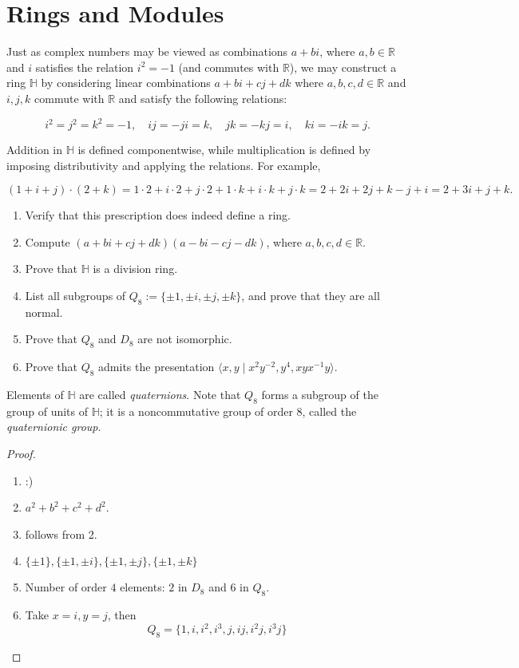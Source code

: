 \documentclass[openany]{book}
\begin{document}
\chapter{Rings and Modules}

\begin{prob}[1.12]
    
Just as complex numbers may be viewed as combinations \( a + bi \), where \( a, b \in \mathbb{R} \) and \( i \) satisfies the relation \( i^2 = -1 \) (and commutes with \(\mathbb{R}\)), we may construct a ring \(\mathbb{H}\) by considering linear combinations \( a + bi + cj + dk \) where \( a, b, c, d \in \mathbb{R} \) and \( i, j, k \) commute with \(\mathbb{R}\) and satisfy the following relations:

\[
i^2 = j^2 = k^2 = -1, \quad ij = -ji = k, \quad jk = -kj = i, \quad ki = -ik = j.
\]

Addition in \(\mathbb{H}\) is defined componentwise, while multiplication is defined by imposing distributivity and applying the relations. For example,

\[
(1+i+j) \cdot (2+k) = 1 \cdot 2 + i \cdot 2 + j \cdot 2 + 1 \cdot k + i \cdot k + j \cdot k = 2 + 2i + 2j + k - j + i = 2 + 3i + j + k.
\]
\begin{enumerate}
    \item Verify that this prescription does indeed define a ring.
    \item Compute \((a + bi + cj + dk)(a - bi - cj - dk)\), where \( a, b, c, d \in \mathbb{R}\).
    \item Prove that \(\mathbb{H}\) is a division ring.
    \item List all subgroups of \( Q_8 := \{\pm 1, \pm i, \pm j, \pm k\} \), and prove that they are all normal.
    \item Prove that \( Q_8 \) and \( D_8 \) are not isomorphic.
    \item Prove that \( Q_8 \) admits the presentation \(\langle x, y \mid x^2 y^{-2}, y^4, xy x^{-1} y \rangle\).
\end{enumerate}

Elements of \(\mathbb{H}\) are called \textit{quaternions}. Note that \( Q_8 \) forms a subgroup of the group of units of \(\mathbb{H}\); it is a noncommutative group of order 8, called the \textit{quaternionic group}.
\end{prob}
\begin{proof}
    \begin{enumerate}
        \item :)
        \item $a^2+b^2+c^2+d^2$.
        \item follows from 2.
        \item $\{\pm 1\}, \{\pm 1,\pm i\},  \{\pm 1,\pm j\},  \{\pm 1,\pm k\}$
        \item Number of order $4$ elements: $2$ in $D_8$ and $6$ in $Q_8$.
        \item Take $x=i, y=j$, then 
        \begin{equation*}
            Q_8=\{1, i, i^2, i^3, j, ij, i^2j, i^3j\}
        \end{equation*}
    \end{enumerate}
\end{proof}
\end{document}
